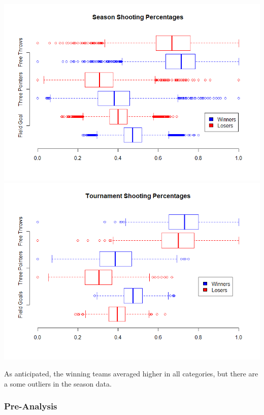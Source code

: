 \documentclass[11pt]{beamer}
\begin{document}
\begin{frame}
\begin{center}
	\includegraphics[scale=0.255]{SeasonShotPercent.png}
	\includegraphics[scale=0.255]{TourneyShotPercent.png}  
\end{center}
\footnotesize \center As anticipated, the winning teams averaged higher in all categories, but there are a some outliers in the season data.
\frametitle{{\textbf{\huge Pre-Analysis}}}
\end{frame}
\end{document}
